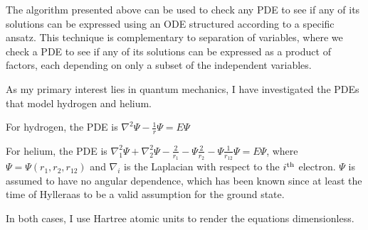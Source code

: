 \documentclass{article}
\begin{document}
The algorithm presented above can be used to check any PDE to see if any of its solutions
can be expressed using an ODE structured according to a specific ansatz.  This technique
is complementary to separation of variables, where we check a PDE to see if any of
its solutions can be expressed as a product of factors, each depending on only
a subset of the independent variables.

As my primary interest lies in quantum mechanics, I have investigated the PDEs
that model hydrogen and helium.

For hydrogen, the PDE is $\nabla^2 \Psi - \frac{1}{r} \Psi = E \Psi$

For helium, the PDE is $\nabla_1^2 \Psi + \nabla_2^2 \Psi - \frac{2}{r_1} - \Psi \frac{2}{r_2} - \Psi \frac{1}{r_{12}} \Psi = E \Psi$,
where $\Psi=\Psi(r_1,r_2,r_{12})$ and $\nabla_i$ is the Laplacian with respect to the $i^{\rm th}$ electron.
$\Psi$ is assumed to have no angular dependence, which has been known since
at least the time of Hylleraas to be a valid assumption for the ground state.

In both cases, I use Hartree atomic units to render the equations dimensionless.

\end{document}
